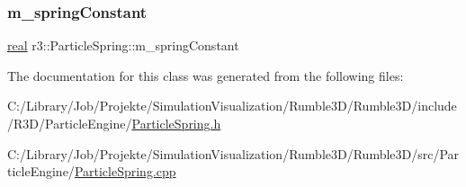 \subsubsection{\texorpdfstring{m\+\_\+spring\+Constant}{m\_springConstant}}
{\footnotesize\ttfamily \mbox{\hyperlink{namespacer3_ab2016b3e3f743fb735afce242f0dc1eb}{real}} r3\+::\+Particle\+Spring\+::m\+\_\+spring\+Constant\hspace{0.3cm}{\ttfamily [protected]}}



The documentation for this class was generated from the following files\+:\begin{DoxyCompactItemize}
\item 
C\+:/\+Library/\+Job/\+Projekte/\+Simulation\+Visualization/\+Rumble3\+D/\+Rumble3\+D/include/\+R3\+D/\+Particle\+Engine/\mbox{\hyperlink{_particle_spring_8h}{Particle\+Spring.\+h}}\item 
C\+:/\+Library/\+Job/\+Projekte/\+Simulation\+Visualization/\+Rumble3\+D/\+Rumble3\+D/src/\+Particle\+Engine/\mbox{\hyperlink{_particle_spring_8cpp}{Particle\+Spring.\+cpp}}\end{DoxyCompactItemize}
